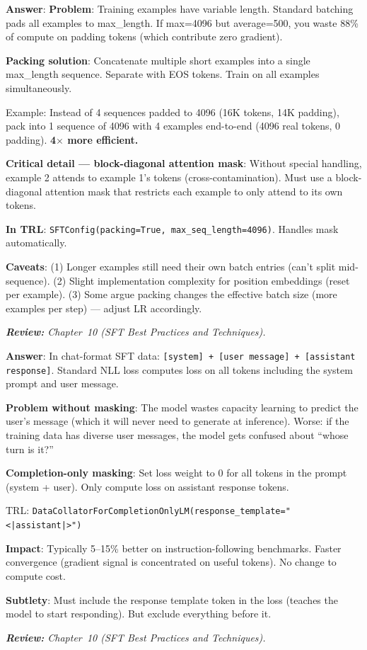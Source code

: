 \begin{questionbox}
\textbf{Answer}: \textbf{Problem}: Training examples have variable length. Standard batching pads all examples to max\_length. If max=4096 but average=500, you waste 88\% of compute on padding tokens (which contribute zero gradient).

\textbf{Packing solution}: Concatenate multiple short examples into a single max\_length sequence. Separate with EOS tokens. Train on all examples simultaneously.

Example: Instead of 4 sequences padded to 4096 (16K tokens, 14K padding), pack into 1 sequence of 4096 with 4 examples end-to-end (4096 real tokens, 0 padding). \textbf{4$\times$ more efficient.}

\textbf{Critical detail --- block-diagonal attention mask}: Without special handling, example 2 attends to example 1’s tokens (cross-contamination). Must use a block-diagonal attention mask that restricts each example to only attend to its own tokens.

\textbf{In TRL}: \texttt{SFTConfig(packing=True, max\_seq\_length=4096)}. Handles mask automatically.

\textbf{Caveats}: (1) Longer examples still need their own batch entries (can’t split mid-sequence). (2) Slight implementation complexity for position embeddings (reset per example). (3) Some argue packing changes the effective batch size (more examples per step) --- adjust LR accordingly.

\emph{\textbf{Review:} Chapter~10 (SFT Best Practices and Techniques).}
\end{questionbox}

\begin{questionbox}
\textbf{Answer}: In chat-format SFT data: \texttt{[system] + [user message] + [assistant response]}. Standard NLL loss computes loss on all tokens including the system prompt and user message.

\textbf{Problem without masking}: The model wastes capacity learning to predict the user’s message (which it will never need to generate at inference). Worse: if the training data has diverse user messages, the model gets confused about ``whose turn is it?''

\textbf{Completion-only masking}: Set loss weight to 0 for all tokens in the prompt (system + user). Only compute loss on assistant response tokens.

TRL: \texttt{DataCollatorForCompletionOnlyLM(response\_template="<|assistant|>")}

\textbf{Impact}: Typically 5--15\% better on instruction-following benchmarks. Faster convergence (gradient signal is concentrated on useful tokens). No change to compute cost.

\textbf{Subtlety}: Must include the response template token in the loss (teaches the model to start responding). But exclude everything before it.

\emph{\textbf{Review:} Chapter~10 (SFT Best Practices and Techniques).}
\end{questionbox}

